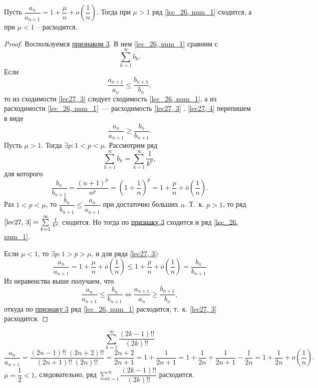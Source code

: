 \documentclass[../../main.tex]{subfiles}
\begin{document}
	\begin{thm}\label{lec27,duamele_raabe}
		Пусть $\dfrac{a_n}{a_{n+1}} = 1 + \dfrac{\mu}{n} + o\left( 
		\dfrac{1}{n}\right) 
		$. Тогда при $\mu > 1$ ряд \eqref{lec_26, num_1} сходится, а при $\mu < 1$ 
		\--- расходится.
		\begin{proof}
			Воспользуемся \hyperref[lec26:comp_test_3]{признаком 3\textdegree}. В нем 
			\eqref{lec_26, num_1} сравним с 
			\begin{equation} \label{lec27, 3}
			\sum_{k = 1}^{\infty} b_k.
			\end{equation}
			Если \begin{equation}\label{lec27, 4}
			\frac{a_{n+1}}{a_n} \le \frac{b_{n+1}}{b_n},
			\end{equation}
			то из сходимости \eqref{lec27, 3} следует сходимость \eqref{lec_26, num_1}, 
			а 
			из расходимости  \eqref{lec_26, num_1}~--- расходимость \eqref{lec27, 3} . 
			\eqref{lec27, 4} перепишем в виде
			\begin{equation} \label{lec27,(5)}
			\frac{a_n}{a_{n+1}} \ge \frac{b_n}{b_{n+1}}.
			\end{equation}
			Пусть $\mu > 1$. Тогда $\exists p :  1 < p < \mu$. Рассмотрим ряд
			\[  \sum_{k=1}^{\infty} b_k = \sum_{k=1}^{\infty} \frac{1}{k^p},\]
			для которого
			\[ \frac{b_n}{b_{n+1}} = \frac{(n+1)^p}{n^p} = \left( 1 + \frac{1}{n} 
			\right)^p = 1 + \frac{p}{n} + \overline{o}\left( \frac{1}{n} \right).       
			\]
			Раз $1 < p < \mu$, то
			$\dfrac{b_n}{b_{n+1}} \le \dfrac{a_n}{a_{n+1}}$
			при достаточно больших $n$. Т.~к. $p > 1$, то ряд $\eqref{lec27, 3} = 
			\sum\limits_{k=1}^{\infty} \frac{1}{k^p}$ сходится. Но тогда по 
			\hyperref[lec26:comp_test_3]{признаку 3\textdegree} сходится и ряд 
			\eqref{lec_26, num_1}.
			
			Если $\mu < 1$, то $\exists p : 1 > p > \mu$, и для ряда \eqref{lec27, 3}:
			\[  \frac{a_n}{a_{n+1}} = 1 + \frac{\mu}{n} + \overline{o}\left( 
			\frac{1}{n} \right) \le  1 + \frac{p}{n} + \overline{o}\left( \frac{1}{n} 
			\right) = \frac{b_n}{b_{n+1}}                   \]
			Из неравенства выше получаем, что
			\[\frac{a_n}{a_{n+1}} \le \frac{b_n}{b_{n+1}} \iff \frac{a_{n+1}}{a_n} \ge 
			\frac{b_{n+1}}{b_n},\]
			откуда по \hyperref[lec26:comp_test_3]{признаку 3\textdegree} ряд 
			\eqref{lec_26, num_1} расходится, т.~к. 
			\eqref{lec27, 3} расходится.
		\end{proof}
	\end{thm}	
	
	
	\begin{example}
		\[ \sum_{k=1}^{\infty} \frac{(2k-1)!!}{(2k)!!}    \]
		\[ \frac{a_n}{a_{n+1}} = \frac{ (2n-1)!! \; (2n+2)!!}{ (2n+1)!! \;  (2n)!! } 
		= \frac{2n+2}{2n+1} = 1 + \frac{1}{2n+1} = 1 + \frac{1}{2n} + \frac{1}{2n+1} 
		- \frac{1}{2n} = 1 + \frac{1}{2n} + o\left( \frac{1}{n} \right). \]
		$\mu = \dfrac{1}{2} < 1$, следовательно, ряд $\sum\limits_{k=1}^{\infty} 
		\dfrac{(2k-1)!!}{(2k)!!}$ расходится.
	\end{example}	
\end{document}
